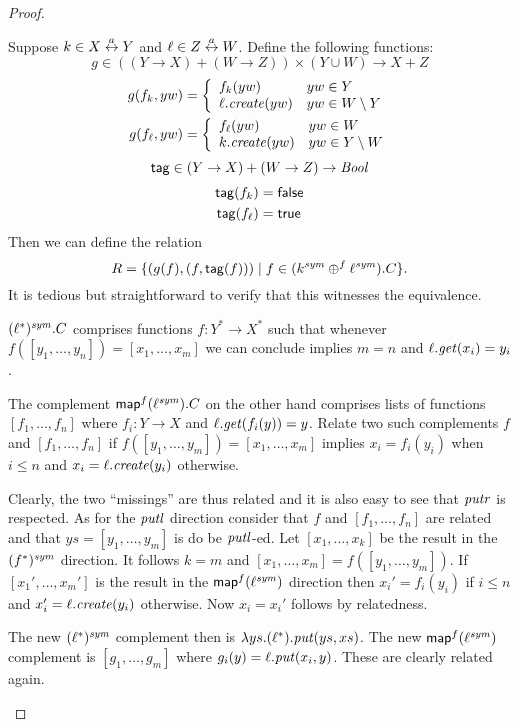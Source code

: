 \begin{defn}[$R$-similarity]
\begin{theorem}
\begin{lemma}
\begin{theorem}[No products]
\begin{lemma}
\begin{defn}
\begin{theorem}
\begin{theorem}
\begin{corollary}[Hylomorphism]
\begin{defn}
\begin{defn}
\begin{defn}[Symmetrization]
\begin{proof}
\begin{longenum}
\item Suppose $k \in X \overset{a}{\leftrightarrow} Y$ and $\ell \in Z \overset{a}{\leftrightarrow} W$.  Define the
following functions:
\[g \in ((Y \to X) + (W \to Z)) \times (Y \cup W) \to X + Z\]
\begin{align*}
    g( f_k,yw) &= \left\{\begin{array}{ll}
         f_k(yw) & yw \in Y \\
         \ell.\mathit{create}(yw) & yw \in W \setminus Y
        \end{array}\right. \\
    g( f_\ell,yw) &= \left\{\begin{array}{ll}
         f_\ell(yw) & yw \in W \\
         k.\mathit{create}(yw) & yw \in Y \setminus W
        \end{array}\right.
\end{align*}
\[\mathsf{tag} \in (Y \to X) + (W \to Z) \to \mathit{Bool}\]
\begin{align*}
    \mathsf{tag}( f_k) &= \mathsf{false} \\
    \mathsf{tag}( f_\ell) &= \mathsf{true}
\end{align*}
Then we can define the relation
\[R = \{(g(f),(f,\mathsf{tag}(f))) \mid f \in (k^\mathit{sym} \oplus^f \ell^\mathit{sym}).C\}.\]
It is tedious but straightforward to verify that this witnesses the
equivalence.
\item $(\ell^*)^\mathit{sym}.C$ comprises functions $f:Y^*\to X^*$ such that
\ifdissertation whenever \fi $f([y_1,\dots,y_n])=[x_1,\dots,x_m]$
\ifdissertation we can conclude \else implies \fi $m=n$ and
$\ell.\mathit{get}(x_i)=y_i$.

The complement $\mathsf{map}^f(\ell^\mathit{sym}).C$ on the other hand comprises lists
of functions $[f_1,\dots,f_n]$ where $f_i:Y\to X$ and
$\ell.\mathit{get}(f_i(y))=y$. Relate two such complements $f$ and
$[f_1,\dots,f_n]$ if $f([y_1,\dots,y_m])=[x_1,\dots,x_m]$ implies
$x_i=f_i(y_i)$ when $i\leq n$ and $x_i=\ell.\mathit{create}(y_i)$ otherwise. 

Clearly, the two ``missings'' are thus related and it is also easy to see
that $\mathit{putr}$ is respected. As for the $\mathit{putl}$ direction consider that
$f$ and $[f_1,\dots,f_n]$ are related and that $ys=[y_1,\dots,y_m]$ is
do be $\mathit{putl}$-ed. Let $[x_1,\dots,x_k]$ be the result in the
$(f^*)^\mathit{sym}$ direction. It follows $k=m$ and
$[x_1,\dots,x_m]=f([y_1,\dots,y_m])$. If $[x_1',\dots,x_m']$ is the
 result in the
$\mathsf{map}^f(\ell^\mathit{sym})$ direction then $x_i'=f_i(y_i)$ if $i\leq n$ and
$x_i'=\ell.\mathit{create}(y_i)$ otherwise. Now $x_i=x_i'$  follows by
relatedness. 

The new $(\ell^*)^\mathit{sym}$ complement then is $\lambda
ys.(\ell^*).\mathit{put}(ys,xs)$. The new $\mathsf{map}^f(\ell^\mathit{sym})$ complement is
$[g_1,\dots,g_m]$ where $g_i(y)=\ell.\mathit{put}(x_i,y)$. These are clearly
related again. 
\endofpf
\end{longenum}
\end{proof}
\fi


\end{defn}
\end{defn}
\end{defn}
\end{corollary}
\end{theorem}
\end{theorem}
\end{defn}
\end{lemma}
\end{theorem}
\end{lemma}
\end{theorem}
\end{defn}
